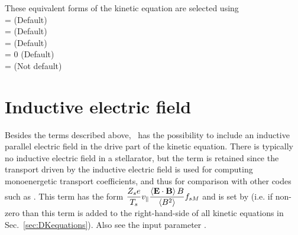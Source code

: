These equivalent forms of the kinetic equation are selected using \\
 = \true  \;\;\; (Default) \\
 = \true \;\;\; (Default) \\
 = \false \;\;\; (Default) \\
 = 0 \;\;\; (Default) \\
 = \true \;\;\; (Not default) %

\section{Inductive electric field}
\label{sec:Inductive-electric-field}
Besides the terms described above, \sfincs~has the possibility to include an inductive parallel electric field in the drive part of the kinetic equation. There is typically no inductive electric field in a stellarator, but the term is retained since the transport driven by the inductive electric field is used for computing monoenergetic transport coefficients, and thus for comparison with other codes such as \dkes. This term has the form $\displaystyle \frac{Z_s e}{T_s} v_\| \frac{\left\langle {\mathbf E} \cdot {\mathbf B}\right\rangle B}{\left\langle B^2\right\rangle} f_{sM}$ and is set by  (i.e. if non-zero than this term is added to the right-hand-side of all kinetic equations in Sec.~\ref{sec:DKequations}). 
Also see the input parameter . 






